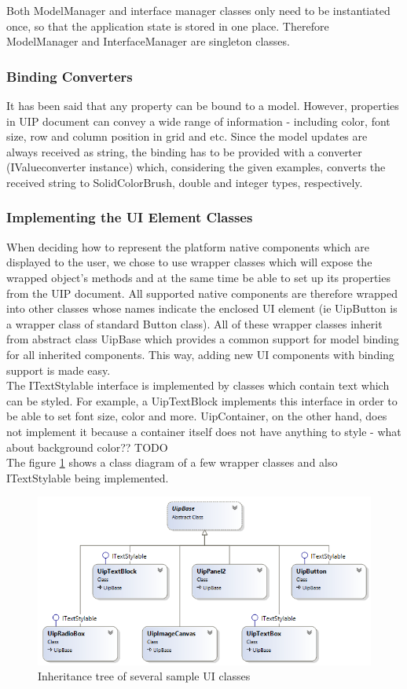 Both ModelManager and interface manager classes only need to be instantiated once, so that the application state is stored in one place. Therefore ModelManager and InterfaceManager are singleton classes.

\subsubsection{Binding Converters}
It has been said that any property can be bound to a model. However, properties in UIP document can convey a wide range of information - including color, font size, row and column position in grid and etc. Since the model updates are always received as string, the binding has to be provided with a converter (IValueconverter instance) which, considering the given examples, converts the received string to SolidColorBrush, double and integer types, respectively.

\subsubsection{Implementing the UI Element Classes}
When deciding how to represent the platform native components which are displayed to the user, we chose to use wrapper classes which will expose the wrapped object's methods and at the same time be able to set up its properties from the UIP document. All supported native components are therefore wrapped into other classes whose names indicate the enclosed UI element (ie UipButton is a wrapper class of standard Button class). All of these wrapper classes inherit from abstract class UipBase which provides a common support for model binding for all inherited components. This way, adding new UI components with binding support is made easy.
\\The ITextStylable interface is implemented by classes which contain text which can be styled. For example, a UipTextBlock implements this interface in order to be able to set font size, color and more. UipContainer, on the other hand, does not implement it because a container itself does not have anything to style - what about background color?? TODO\\
The figure \ref{fig:UIclasses} shows a class diagram of a few wrapper classes and also ITextStylable being implemented.

\begin{figure}[ht!]
\centering
\includegraphics[width=140mm]{pics/UI_classes.png}
\caption{Inheritance tree of several sample UI classes}
\label{fig:UIclasses}
\end{figure}

